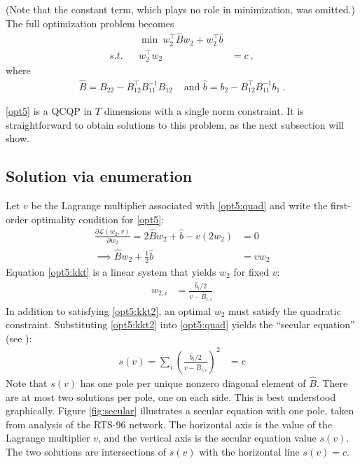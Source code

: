 \documentclass[conference]{IEEEtran}
\begin{document}
(Note that the constant term, which plays no role in minimization, was omitted.) The full optimization problem becomes
\begin{subequations}\label{opt5}
\begin{align}
&& \min~ w_2^\top \hat{B}w_2 + w_2^\top \hat{b} \\
\label{opt5:quad} s.t. && w_2^\top w_2 &= c~,
\end{align}
\end{subequations}
where
\begin{align*}
\hat{B} = B_{22} - B_{12}^\top B_{11}^{-1}B_{12} &\text{ and }\hat{b} = b_2 - B_{12}^\top B_{11}^{-1}b_1~.
\end{align*}

\eqref{opt5} is a QCQP in $T$ dimensions with a single norm constraint. It is straightforward to obtain solutions to this problem, as the next subsection will show.

\subsection{Solution via enumeration}

Let $v$ be the Lagrange multiplier associated with \eqref{opt5:quad} and write the first-order optimality condition for \eqref{opt5}:
\begin{align}
\nonumber \frac{\partial \mathcal{L}(w_2,v)}{\partial w_2} = 2\hat{B}w_2 + \hat{b} - v(2w_2) &= 0 \\
\label{opt5:kkt} \implies \hat{B}w_2 + \frac{1}{2}\hat{b} &= vw_2
\end{align}
Equation \eqref{opt5:kkt} is a linear system that yields $w_2$ for fixed $v$:
\begin{align}
\label{opt5:kkt2}w_{2,i} &= \frac{\hat{b}_i/2}{v - \hat{B}_{i,i}}
\end{align}
In addition to satisfying \eqref{opt5:kkt2}, an optimal $w_2$ must satisfy the quadratic constraint. Substituting \eqref{opt5:kkt2} into \eqref{opt5:quad} yields the ``secular equation'' (see \cite{bienstock2014}):
\begin{align}
s(v) = \sum_{i}\left( \frac{\hat{b}_i /2}{v - \hat{B}_{i,i}}\right)^2 &= c
\end{align}
Note that $s(v)$ has one pole per unique nonzero diagonal element of $\hat{B}$. There are at most two solutions per pole, one on each side. This is best understood graphically. Figure \ref{fig:secular} illustrates a secular equation with one pole, taken from analysis of the RTS-96 network. The horizontal axis is the value of the Lagrange multiplier $v$, and the vertical axis is the secular equation value $s(v)$. The two solutions are intersections of $s(v)$ with the horizontal line $s(v)=c$.
\end{document}
